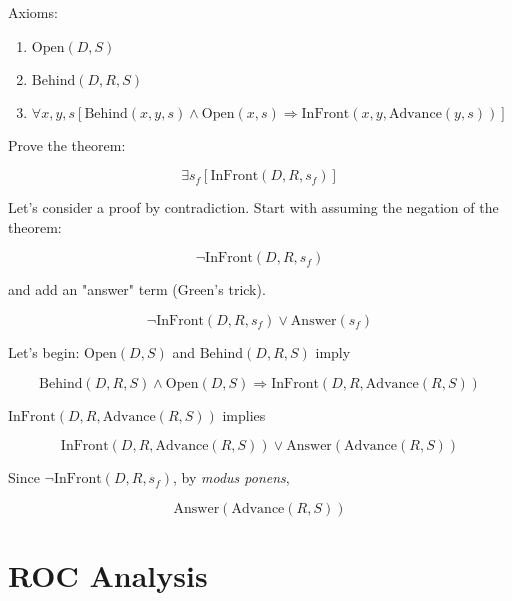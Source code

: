 \documentclass[11pt,largemargins, anonymous]{homework}
\begin{document}
Axioms:

\begin{enumerate}
    \item \( \mathrm{Open}(D, S) \)
    \item \( \mathrm{Behind}(D, R, S) \)
    \item \( \forall x, y, s [ \mathrm{Behind}(x, y, s) \land \mathrm{Open}(x, s) \Rightarrow \mathrm{InFront}(x, y, \mathrm{Advance}(y, s)) ] \)
\end{enumerate}

Prove the theorem:

\[ \exists s_f [ \mathrm{InFront}(D, R, s_f)] \]

Let's consider a proof by contradiction.
Start with assuming the negation of the theorem:

\[ \neg \mathrm{InFront}(D, R, s_f) \]

and add an "answer" term (Green's trick).

\[ \neg \mathrm{InFront}(D, R, s_f) \lor \mathrm{Answer}(s_f) \]

Let's begin: \( \mathrm{Open}(D, S) \) and \( \mathrm{Behind}(D, R, S) \) imply

\[ \mathrm{Behind}(D, R, S) \land \mathrm{Open}(D, S) \Rightarrow \mathrm{InFront}(D, R, \mathrm{Advance}(R, S)) \]

\( \mathrm{InFront}(D, R, \mathrm{Advance}(R, S)) \) implies

\[ \mathrm{InFront}(D, R, \mathrm{Advance}(R, S)) \lor \mathrm{Answer}(\mathrm{Advance}(R, S)) \]

Since \( \neg \mathrm{InFront}(D, R, s_f) \), by \textit{modus ponens},

\[ \mathrm{Answer}(\mathrm{Advance}(R, S)) \]


\part{ROC Analysis}

\question
\end{document}
